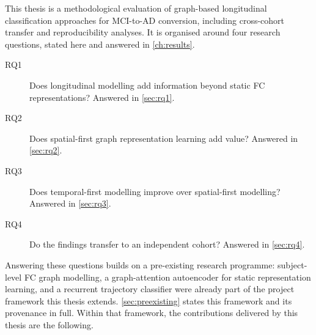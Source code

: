 This thesis is a methodological evaluation of graph-based longitudinal classification
approaches for \ac{MCI}-to-\ac{AD} conversion, including cross-cohort transfer and
reproducibility analyses. It is organised around four research questions, stated here and
answered in \autoref{ch:results}.

\begin{description}
  \item[RQ1] Does longitudinal modelling add information beyond static \ac{FC}
    representations? Answered in \autoref{sec:rq1}.
  \item[RQ2] Does spatial-first graph representation learning add value?
    Answered in \autoref{sec:rq2}.
  \item[RQ3] Does temporal-first modelling improve over spatial-first modelling?
    Answered in \autoref{sec:rq3}.
  \item[RQ4] Do the findings transfer to an independent cohort?
    Answered in \autoref{sec:rq4}.
\end{description}

Answering these questions builds on a pre-existing research programme: subject-level
\ac{FC} graph modelling, a graph-attention autoencoder for static representation learning,
and a recurrent trajectory classifier were already part of the project framework this
thesis extends. \autoref{sec:preexisting} states this framework and its provenance in
full. Within that framework, the contributions delivered by this thesis are the following.

